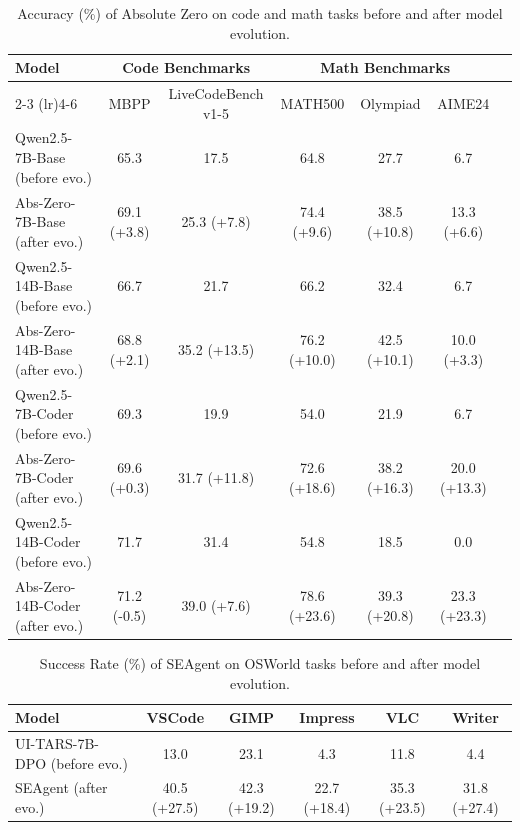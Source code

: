 \documentclass{article} %
\begin{document}
{\begin{table}[H]
\centering
\caption{Accuracy (\%) of Absolute Zero on code and math tasks before and after model evolution.}
\label{tab:performance_abs_zero_code_math}
\vspace{-0.3cm}
\scriptsize
\begin{tabular}{lcccccc}
\toprule
\multirow{2}{*}{Model} & \multicolumn{2}{c}{Code Benchmarks} & \multicolumn{3}{c}{Math Benchmarks} \\
\cmidrule(lr){2-3} \cmidrule(lr){4-6}
 & MBPP & LiveCodeBench v1-5 & MATH500 & Olympiad & AIME24 \\
\midrule
Qwen2.5-7B-Base (before evo.) & 65.3 & 17.5 & 64.8 & 27.7 & 6.7 \\
Abs-Zero-7B-Base (after evo.) & 69.1 (+3.8) & 25.3 (+7.8) & 74.4 (+9.6) & 38.5 (+10.8) & 13.3 (+6.6) \\
\midrule
Qwen2.5-14B-Base (before evo.) & 66.7 & 21.7 & 66.2 & 32.4 & 6.7 \\
Abs-Zero-14B-Base (after evo.) & 68.8 (+2.1) & 35.2 (+13.5) & 76.2 (+10.0) & 42.5 (+10.1) & 10.0 (+3.3) \\
\midrule
Qwen2.5-7B-Coder (before evo.) & 69.3 & 19.9 & 54.0 & 21.9 & 6.7 \\
Abs-Zero-7B-Coder (after evo.) & 69.6 (+0.3) & 31.7 (+11.8) & 72.6 (+18.6) & 38.2 (+16.3) & 20.0 (+13.3) \\
\midrule
Qwen2.5-14B-Coder (before evo.) & 71.7 & 31.4 & 54.8 & 18.5 & 0.0 \\
Abs-Zero-14B-Coder (after evo.) & 71.2 (-0.5) & 39.0 (+7.6) & 78.6 (+23.6) & 39.3 (+20.8) & 23.3 (+23.3) \\
\bottomrule
\end{tabular}
\end{table}

\begin{table}[H]
    \centering
    \scriptsize
    \caption{Success Rate (\%) of SEAgent on OSWorld tasks before and after model evolution.}
    \label{tab:performance_seagent_osworld}
    \begin{tabular}{lccccc}
        \toprule
        Model & VSCode & GIMP & Impress & VLC & Writer \\
        \midrule
        UI-TARS-7B-DPO (before evo.) & 13.0 & 23.1 & 4.3 & 11.8 & 4.4 \\
        SEAgent (after evo.)         & 40.5 (+27.5) & 42.3 (+19.2) & 22.7 (+18.4) & 35.3 (+23.5) & 31.8 (+27.4) \\
        \bottomrule
    \end{tabular}
\end{table}


}
\end{document}
